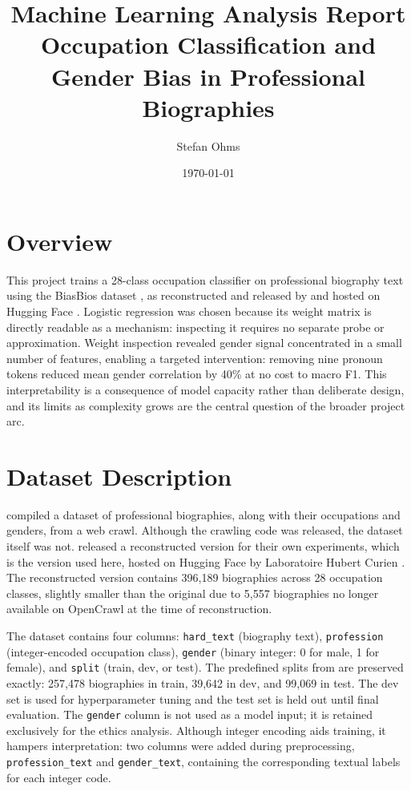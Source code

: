 \documentclass[11pt, a4paper]{article}
\title{%
    \textbf{Machine Learning Analysis Report} \\[0.4em]
    \large Occupation Classification and Gender Bias in Professional Biographies
}
\author{Stefan Ohms}
\date{\today}
\begin{document}
\maketitle
\tableofcontents
\newpage

\section{Overview}

This project trains a 28-class occupation classifier on professional biography 
text using the BiasBios dataset \citep{de2019bias}, as reconstructed and released 
by \citet{ravfogel2020null} and hosted on Hugging Face \citep{labHC_bias_in_bios}. 
Logistic regression was chosen because its weight matrix is directly readable as 
a mechanism: inspecting it requires no separate probe or approximation. 
Weight inspection revealed gender signal concentrated in a small number of 
features, enabling a targeted intervention: removing nine pronoun tokens reduced 
mean gender correlation by 40\% at no cost to macro F1. 
This interpretability is a consequence of model capacity rather than deliberate 
design, and its limits as complexity grows are the central question of the 
broader project arc.

\section{Dataset Description}

\citet{de2019bias} compiled a dataset of professional biographies, along with 
their occupations and genders, from a web crawl. Although the crawling code was 
released, the dataset itself was not. \citet{ravfogel2020null} released a 
reconstructed version for their own experiments, which is the version used here, 
hosted on Hugging Face by Laboratoire Hubert Curien \citep{labHC_bias_in_bios}. 
The reconstructed version contains 396,189 biographies across 28 occupation 
classes, slightly smaller than the original due to 5,557 biographies no longer 
available on OpenCrawl at the time of reconstruction.

The dataset contains four columns: \texttt{hard\_text} (biography text), 
\texttt{profession} (integer-encoded occupation class), \texttt{gender} 
(binary integer: 0 for male, 1 for female), and \texttt{split} 
(train, dev, or test). The predefined splits from \citet{ravfogel2020null} 
are preserved exactly: 257,478 biographies in train, 39,642 in dev, and 
99,069 in test. The dev set is used for hyperparameter tuning and the test 
set is held out until final evaluation. The \texttt{gender} column is not 
used as a model input; it is retained exclusively for the ethics analysis. 
Although integer encoding aids training, it hampers interpretation: two 
columns were added during preprocessing, \texttt{profession\_text} and 
\texttt{gender\_text}, containing the corresponding textual labels for each 
integer code.
\end{document}
